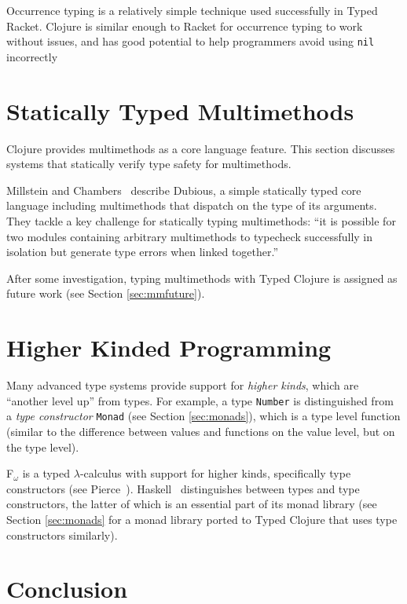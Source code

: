 Occurrence typing is a relatively simple technique used successfully 
in Typed Racket. Clojure is similar enough to Racket for occurrence typing to work
without issues, and has good potential to help programmers avoid using
\lstinline|nil| incorrectly

\section{Statically Typed Multimethods}

Clojure provides multimethods as a core language feature. This section discusses systems that statically
verify type safety for multimethods.

Millstein and Chambers~\cite{MS02}
describe Dubious, a simple statically typed core language including multimethods that
dispatch on the type of its arguments. They tackle a key challenge for statically typing
multimethods: ``it is possible for two modules containing arbitrary multimethods to typecheck
successfully in isolation but generate type errors when linked together.''~\cite{MS02}

After some investigation, typing multimethods with Typed Clojure is assigned as future work
(see Section \ref{sec:mmfuture}).

\section{Higher Kinded Programming}

Many advanced type systems provide support for \emph{higher kinds},
which are ``another level up'' from types.
For example, a type \lstinline|Number| is distinguished from a
\emph{type constructor} \lstinline|Monad| (see Section \ref{sec:monads}), which is a type level function
(similar to the difference between values and functions on the value level, but on the type level).

F$_\omega$ is a typed $\lambda$-calculus with support for higher kinds,
specifically type constructors (see Pierce~\cite{Pie02}).
Haskell~\cite{Mar10} distinguishes between types and type constructors,
the latter of which is an essential part of its monad library 
(see Section \ref{sec:monads} for a monad library ported to Typed Clojure
that uses type constructors similarly).

\section{Conclusion}

